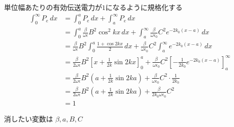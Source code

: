 \documentclass[a4paper,10pt]{bxjsarticle}
\begin{document}
単位幅あたりの有効伝送電力が$1$になるように規格化する
\begin{align*}
    \int_0^\infty P_e \,dx 
    &= \int_0^a P_e \,dx + \int_a^\infty P_e \,dx\\
    &= \int_0^a \frac{\beta}{\omega \epsilon} B^2 \cos^2 kx  \,dx 
     + \int_a^\infty \frac{\beta}{\omega \epsilon_0} C^2 e^{-2k_0(x-a)} \,dx\\
    &= \frac{\beta}{\omega \epsilon} B^2 \int_0^a \frac{1+\cos 2kx}{2}  \,dx 
     + \frac{\beta}{\omega \epsilon_0} C^2 \int_a^\infty  e^{-2k_0(x-a)} \,dx\\
    &= \frac{\beta}{2\omega \epsilon} B^2 \left[ x + \frac{1}{2k} \sin 2kx \right]_0^a 
     + \frac{\beta}{\omega \epsilon_0} C^2 \left[ -\frac{1}{2k_0} e^{-2k_0(x-a)} \right]_a^\infty \\
    &= \frac{\beta}{2\omega \epsilon} B^2 \left( a + \frac{1}{2k} \sin 2ka \right)
     + \frac{\beta}{\omega \epsilon_0} C^2 \cdot \frac{1}{2k_0} \\
    &= \frac{\beta}{2\omega \epsilon} B^2 \left( a + \frac{1}{2k} \sin 2ka \right) + \frac{\beta}{2k_0 \omega \epsilon_0} C^2 \\
    &= 1
\end{align*}

消したい変数は $\beta, a, B, C$




  
\end{document}
